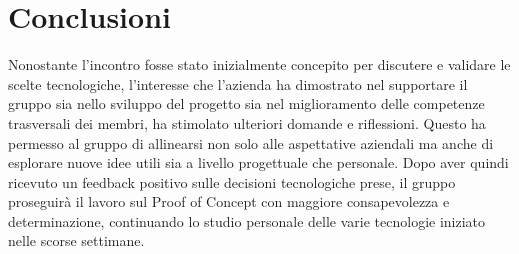 \documentclass[10pt]{article}
\begin{document}
    \section{Conclusioni}
    Nonostante l’incontro fosse stato inizialmente concepito per discutere e validare le scelte tecnologiche, l'interesse che l'azienda ha dimostrato nel supportare il gruppo sia nello sviluppo del progetto sia nel miglioramento delle competenze trasversali dei membri, ha stimolato ulteriori domande e riflessioni. Questo ha permesso al gruppo di allinearsi non solo alle aspettative aziendali ma anche di esplorare nuove idee utili sia a livello progettuale che personale.
    Dopo aver quindi ricevuto un feedback positivo sulle decisioni tecnologiche prese, il gruppo proseguirà il lavoro sul Proof of Concept con maggiore consapevolezza e determinazione, continuando lo studio personale delle varie tecnologie iniziato nelle scorse settimane.
    \newpage
    \newpage
\end{document}
